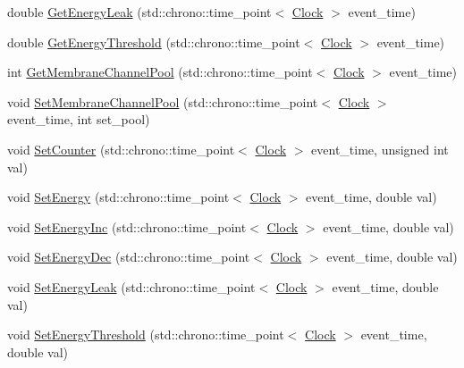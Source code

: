 \begin{DoxyCompactItemize}
double \mbox{\hyperlink{classMembrane_ac6c8d1f7348b24e448e8163260500b89}{Get\+Energy\+Leak}} (std\+::chrono\+::time\+\_\+point$<$ \mbox{\hyperlink{universe_8h_a0ef8d951d1ca5ab3cfaf7ab4c7a6fd80}{Clock}} $>$ event\+\_\+time)
\item 
double \mbox{\hyperlink{classMembrane_a7ce7398888bdad73ac848a2362261acf}{Get\+Energy\+Threshold}} (std\+::chrono\+::time\+\_\+point$<$ \mbox{\hyperlink{universe_8h_a0ef8d951d1ca5ab3cfaf7ab4c7a6fd80}{Clock}} $>$ event\+\_\+time)
\item 
int \mbox{\hyperlink{classMembrane_a270278dd346edfe8c7bbd4c48929fdd5}{Get\+Membrane\+Channel\+Pool}} (std\+::chrono\+::time\+\_\+point$<$ \mbox{\hyperlink{universe_8h_a0ef8d951d1ca5ab3cfaf7ab4c7a6fd80}{Clock}} $>$ event\+\_\+time)
\item 
void \mbox{\hyperlink{classMembrane_aeda845ea9577e6a07690acad22ef375f}{Set\+Membrane\+Channel\+Pool}} (std\+::chrono\+::time\+\_\+point$<$ \mbox{\hyperlink{universe_8h_a0ef8d951d1ca5ab3cfaf7ab4c7a6fd80}{Clock}} $>$ event\+\_\+time, int set\+\_\+pool)
\item 
void \mbox{\hyperlink{classMembrane_a4bff43b38d7046867f220392a39cc272}{Set\+Counter}} (std\+::chrono\+::time\+\_\+point$<$ \mbox{\hyperlink{universe_8h_a0ef8d951d1ca5ab3cfaf7ab4c7a6fd80}{Clock}} $>$ event\+\_\+time, unsigned int val)
\item 
void \mbox{\hyperlink{classMembrane_a37beeb28761af644bc3a51d3509f14f1}{Set\+Energy}} (std\+::chrono\+::time\+\_\+point$<$ \mbox{\hyperlink{universe_8h_a0ef8d951d1ca5ab3cfaf7ab4c7a6fd80}{Clock}} $>$ event\+\_\+time, double val)
\item 
void \mbox{\hyperlink{classMembrane_abd1c69b9b0260799afd3965c34f881ff}{Set\+Energy\+Inc}} (std\+::chrono\+::time\+\_\+point$<$ \mbox{\hyperlink{universe_8h_a0ef8d951d1ca5ab3cfaf7ab4c7a6fd80}{Clock}} $>$ event\+\_\+time, double val)
\item 
void \mbox{\hyperlink{classMembrane_acefb2fe781d7316b232614663777cde1}{Set\+Energy\+Dec}} (std\+::chrono\+::time\+\_\+point$<$ \mbox{\hyperlink{universe_8h_a0ef8d951d1ca5ab3cfaf7ab4c7a6fd80}{Clock}} $>$ event\+\_\+time, double val)
\item 
void \mbox{\hyperlink{classMembrane_a96618ef2c05a8af5d6bd8606c9b8eae8}{Set\+Energy\+Leak}} (std\+::chrono\+::time\+\_\+point$<$ \mbox{\hyperlink{universe_8h_a0ef8d951d1ca5ab3cfaf7ab4c7a6fd80}{Clock}} $>$ event\+\_\+time, double val)
\item 
void \mbox{\hyperlink{classMembrane_a6d0b96fb6d823cc113dd56b8889b1544}{Set\+Energy\+Threshold}} (std\+::chrono\+::time\+\_\+point$<$ \mbox{\hyperlink{universe_8h_a0ef8d951d1ca5ab3cfaf7ab4c7a6fd80}{Clock}} $>$ event\+\_\+time, double val)

\end{DoxyCompactItemize}
